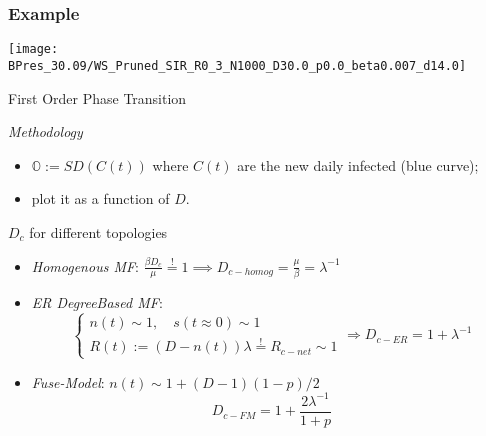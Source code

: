 \documentclass{beamer}
\begin{document}
\begin{frame}
	\frametitle{Example}
	\texttt{[image: BPres\_30.09/WS\_Pruned\_SIR\_R0\_3\_N1000\_D30.0\_p0.0\_beta0.007\_d14.0]}
\end{frame}

\begin{frame}{First Order Phase Transition}
	\vspace*{-2mm}
	\begin{block}{\textit{Methodology}}
		\begin{itemize}
			\item $\mathbb{O}:=SD(C(t))$ where $C(t)$ are the new daily infected (blue curve);
			\item plot it as a function of $D$.
		\end{itemize} 
	\end{block}
	\vspace{-2mm}
	\begin{block}{$D_c$ for different topologies}
		\begin{itemize}
			\item \textit{Homogenous MF}: $\frac{\beta D_c}{\mu} \stackrel{!}{=} 1 \implies D_{c-homog} = \frac{\mu}{\beta} = \lambda^{-1}$
			\item \textit{ER DegreeBased MF}: 
			\begin{equation}
				\begin{cases}
					n(t) \sim 1, \quad s(t\approx0) \sim 1 \\
					R(t):= (D-n(t))\lambda \stackrel{!}{=} R_{c-net} \sim 1
				\end{cases}
				 \Rightarrow D_{c-ER} = 1+\lambda^{-1}
			\end{equation}
			\item \textit{Fuse-Model}: $n(t) \sim 1+(D-1)(1-p)/2$	
			\begin{equation}
				D_{c-FM} = 1+ \frac{2\lambda^{-1}}{1+p}
			\end{equation}
		\end{itemize}
	\end{block}
\end{frame}
\end{document}
